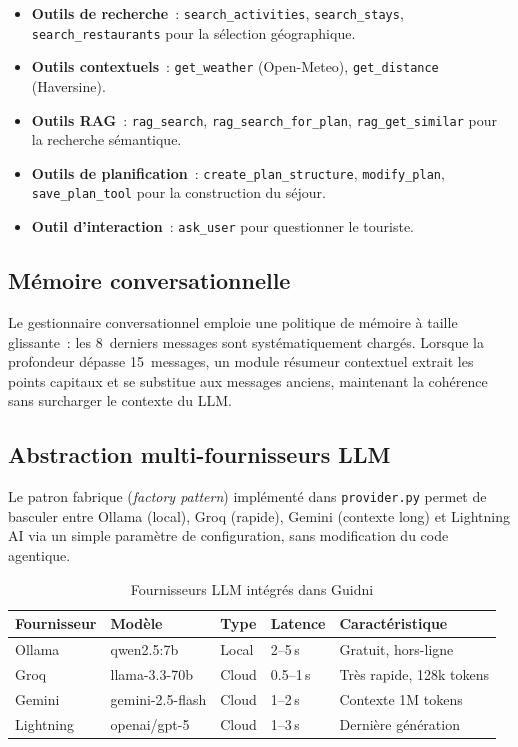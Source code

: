 \begin{itemize}
    \item \textbf{Outils de recherche}~: \texttt{search\_activities}, \texttt{search\_stays},
    \texttt{search\_restaurants} pour la sélection géographique.
    \item \textbf{Outils contextuels}~: \texttt{get\_weather} (Open-Meteo),
    \texttt{get\_distance} (Haversine).
    \item \textbf{Outils RAG}~: \texttt{rag\_search}, \texttt{rag\_search\_for\_plan},
    \texttt{rag\_get\_similar} pour la recherche sémantique.
    \item \textbf{Outils de planification}~: \texttt{create\_plan\_structure},
    \texttt{modify\_plan}, \texttt{save\_plan\_tool} pour la construction du séjour.
    \item \textbf{Outil d'interaction}~: \texttt{ask\_user} pour questionner le touriste.
\end{itemize}

\subsection{Mémoire conversationnelle}

Le gestionnaire conversationnel emploie une politique de mémoire à taille glissante~: les
8~derniers messages sont systématiquement chargés. Lorsque la profondeur dépasse 15~messages,
un module résumeur contextuel extrait les points capitaux et se substitue aux messages anciens,
maintenant la cohérence sans surcharger le contexte du LLM.

\subsection{Abstraction multi-fournisseurs LLM}

Le patron fabrique (\textit{factory pattern}) implémenté dans \texttt{provider.py} permet
de basculer entre Ollama (local), Groq (rapide), Gemini (contexte long) et Lightning AI
via un simple paramètre de configuration, sans modification du code agentique.

\begin{table}[H]
    \centering
    \caption{Fournisseurs LLM intégrés dans Guidni}
    \label{tab:llm_providers}
    \small
    \begin{tabular}{p{2cm} p{3cm} p{1.5cm} p{2cm} p{4cm}}
        \toprule
        \textbf{Fournisseur} & \textbf{Modèle} & \textbf{Type} & \textbf{Latence} &
        \textbf{Caractéristique} \\
        \midrule
        Ollama & qwen2.5:7b & Local & 2--5\,s & Gratuit, hors-ligne \\[3pt]
        Groq & llama-3.3-70b & Cloud & 0.5--1\,s & Très rapide, 128k tokens \\[3pt]
        Gemini & gemini-2.5-flash & Cloud & 1--2\,s & Contexte 1M tokens \\[3pt]
        Lightning & openai/gpt-5 & Cloud & 1--3\,s & Dernière génération \\
        \bottomrule
    \end{tabular}
\end{table}

